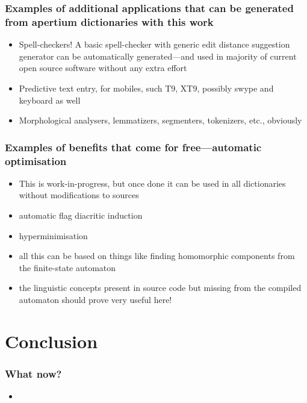 \documentclass{beamer}
\begin{document}
\begin{frame}
    \frametitle{Examples of additional applications that can be generated from
    apertium dictionaries with this work}
    \begin{itemize}
        \item Spell-checkers! A basic spell-checker with generic edit distance
            suggestion generator can be automatically generated---and used in
            majority of current open source software without any extra effort
        \item Predictive text entry, for mobiles, such T9, XT9, possibly swype
            and keyboard as well
        \item Morphological analysers, lemmatizers, segmenters, tokenizers,
            etc., obviously
    \end{itemize}
\end{frame}

\begin{frame}
    \frametitle{Examples of benefits that come for free---automatic optimisation}
    \begin{itemize}
        \item This is work-in-progress, but once done it can be used in all
            dictionaries without modifications to sources
        \item automatic flag diacritic induction
        \item hyperminimisation
        \item all this can be based on things like finding homomorphic
            components from the finite-state automaton
        \item the linguistic concepts present in source code but missing from
            the compiled automaton should prove very useful here!
    \end{itemize}
\end{frame}

\section{Conclusion}

\begin{frame}
    \frametitle{What now?}
    \begin{itemize}
        \item 
    \end{itemize}
\end{frame}
\end{document}
